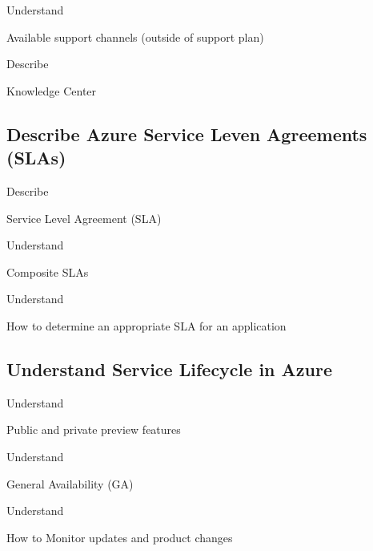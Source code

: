 \documentclass{scrartcl}
\newenvironment{flashcard}[2][]{%
    #1
    \vfill
    \centerline{\Large{#2}}
    \vfill
    \newpage
}
{\newpage}
\newcommand{\subsectioncard}[1]{
    \vspace*{\stretch{1}}
    \subsection{#1}
    \vspace*{\stretch{1}}
    \pagebreak
}
\begin{document}
    \begin{flashcard}[Understand]{Available support channels (outside of support plan)}

    \end{flashcard}

    \begin{flashcard}[Describe]{Knowledge Center}

    \end{flashcard}

    \subsectioncard{Describe Azure Service Leven Agreements (SLAs)}

    \begin{flashcard}[Describe]{Service Level Agreement (SLA)}

    \end{flashcard}

    \begin{flashcard}[Understand]{Composite SLAs}

    \end{flashcard}

    \begin{flashcard}[Understand]{How to determine an appropriate SLA for an application}

    \end{flashcard}

    \subsectioncard{Understand Service Lifecycle in Azure}

    \begin{flashcard}[Understand]{Public and private preview features}

    \end{flashcard}

    \begin{flashcard}[Understand]{General Availability (GA)}

    \end{flashcard}

    \begin{flashcard}[Understand]{How to Monitor updates and product changes}

    \end{flashcard}

    \doclicenseThis
    \pagebreak
\end{document}
